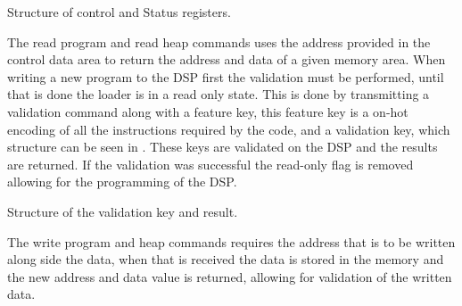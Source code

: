 \begin{table}[H]
	\centering
		
		\caption{Structure of control and Status registers.}
		\label{tab:controlregisters}
\end{table}

The read program and read heap commands uses the address provided in the control data area to return the address and data of a given memory area.
When writing a new program to the DSP first the validation must be performed, until that is done the loader is in a read only state. This is done by transmitting a validation command along with a feature key, this feature key is a on-hot encoding of all the instructions required by the code, and a validation key, which structure can be seen in . These keys are validated on the DSP and the results are returned. If the validation was successful the read-only flag is removed allowing for the programming of the DSP.

\begin{table}[H]
	\centering
		
		\caption{Structure of the validation key and result.}
		\label{tab:validationkey}
\end{table}

The write program and heap commands requires the address that is to be written along side the data, when that is received the data is stored in the memory and the new address and data value is returned, allowing for validation of the written data.
